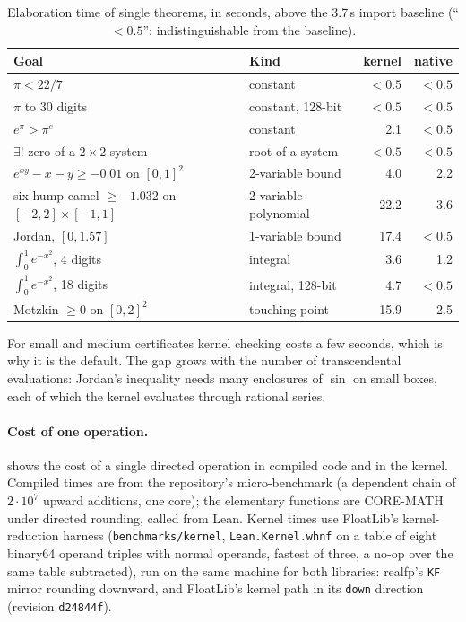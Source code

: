 \documentclass[11pt]{article}
\theoremstyle{definition}
\theoremstyle{remark}
\newcommand{\lean}[1]{\texttt{#1}}
\newcommand{\realfp}{\textsf{realfp}}
\begin{document}
\begin{table}[ht]
\centering\small
\caption{Elaboration time of single theorems, in seconds, above the 3.7\,s
import baseline (``$<0.5$'': indistinguishable from the baseline).}
\label{tab:kn}
\begin{tabular}{@{}llrr@{}}
\toprule
Goal & Kind & kernel & native\\
\midrule
$\pi<22/7$ & constant & $<0.5$ & $<0.5$\\
$\pi$ to 30 digits & constant, 128-bit & $<0.5$ & $<0.5$\\
$e^\pi>\pi^e$ & constant & 2.1 & $<0.5$\\
$\exists!$ zero of a $2\times2$ system & root of a system & $<0.5$ & $<0.5$\\
$e^{xy}-x-y\ge-0.01$ on $[0,1]^2$ & 2-variable bound & 4.0 & 2.2\\
six-hump camel $\ge-1.032$ on $[-2,2]\times[-1,1]$ & 2-variable polynomial & 22.2 & 3.6\\
Jordan, $[0,1.57]$ & 1-variable bound & 17.4 & $<0.5$\\
$\int_0^1e^{-x^2}$, 4 digits & integral & 3.6 & 1.2\\
$\int_0^1e^{-x^2}$, 18 digits & integral, 128-bit & 4.7 & $<0.5$\\
Motzkin $\ge0$ on $[0,2]^2$ & touching point & 15.9 & 2.5\\
\bottomrule
\end{tabular}
\end{table}

For small and medium certificates kernel checking costs a few seconds,
which is why it is the default. The gap grows with the number of
transcendental evaluations: Jordan's inequality needs many enclosures of
$\sin$ on small boxes, each of which the kernel evaluates through rational
series.

\paragraph{Cost of one operation.}
 shows the cost of a single directed operation in compiled
code and in the kernel. Compiled times are from the repository's
micro-benchmark (a dependent chain of $2\cdot10^7$ upward additions, one
core); the elementary functions are CORE-MATH under directed rounding,
called from Lean. Kernel times use FloatLib's kernel-reduction harness
(\lean{benchmarks/kernel}, \lean{Lean.Kernel.whnf} on a table of eight
binary64 operand triples with normal operands, fastest of three, a no-op
over the same table subtracted), run on the same machine for both
libraries: \realfp's \lean{KF} mirror rounding downward, and FloatLib's
kernel path in its \lean{down} direction (revision \lean{d24844f}).
\end{document}

